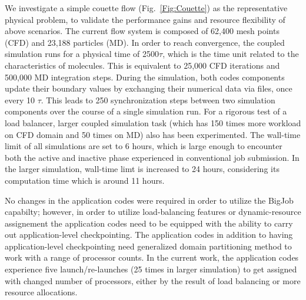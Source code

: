 \documentclass[conference,final]{IEEEtran}
\begin{document}
We investigate a simple couette flow (Fig.~\ref{Fig:Couette}) as the
representative physical problem, to validate the performance gains and
resource flexibility of above scenarios.
The current flow system is
composed of 62,400 mesh points (CFD) and 23,188 particles (MD).
In order to reach convergence, the coupled simulation runs for a
physical time of 2500$\tau$, which is the time unit related to the
characteristics of molecules. This is equivalent to 25,000 CFD
iterations and 500,000 MD integration steps. During the simulation,
both codes components update their boundary values by exchanging their
numerical data via files, once every 10 $\tau$. This leads to 250
synchronization steps between two simulation components over the
course of a single simulation run. For a rigorous test of a load
balancer, larger coupled simulation task (which has 150 times more
workload on CFD domain and 50 times on MD) also has been
experimented. The wall-time limit of all simulations are set to 6
hours, which is large enough to encounter both the active and inactive
phase experienced in conventional job submission. In the larger
simulation, wall-time limt is increased to 24 hours, considering its
computation time which is around 11 hours.

No changes in the application codes were required in order to utilize
the BigJob capabilty; however, in order to utilize load-balancing
features or dynamic-resource assignement the application codes need to
be equipped with the ability to carry out application-level
checkpointing.  The application codes in addition to having
application-level checkpointing need generalized domain partitioning
method to work with a range of processor counts. In the current work,
the application codes experience five launch/re-launches (25 times in
larger simulation) to get assigned with changed number of processors,
either by the result of load balancing or more resource allocations.


\end{document}
